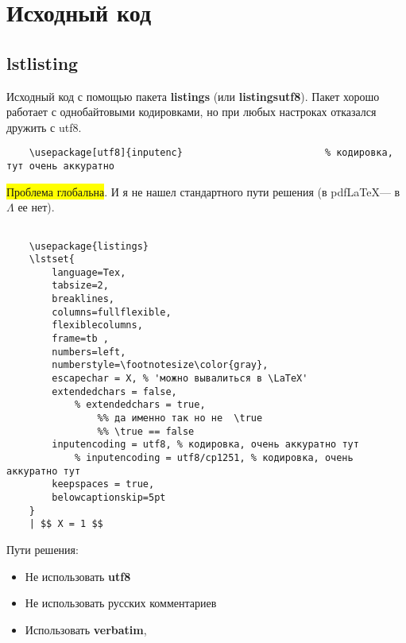 \section[Исходный код]{Исходный код}

\subsection{lstlisting}

Исходный код с помощью пакета \textbf{listings} (или \textbf{listingsutf8}).
Пакет хорошо работает с однобайтовыми кодировками, но при любых настроках отказался дружить с utf8.

\begin{lstlisting}
	\usepackage[utf8]{inputenc}							% кодировка, тут очень аккуратно
\end{lstlisting}

\colorbox{yellow}{Проблема глобальна}.
И я не нашел стандартного пути решения (в pdf\LaTeX --- в $\Lambda$ ее нет).

\begin{lstlisting}[firstnumber=100]

	\usepackage{listings}
	\lstset{
		language=Tex,
		tabsize=2,
		breaklines,
		columns=fullflexible,
		flexiblecolumns,
		frame=tb ,
		numbers=left,
		numberstyle=\footnotesize\color{gray},
		escapechar = X, % 'можно вывалиться в \LaTeX'
		extendedchars = false,
			% extendedchars = true,
				%% да именно так но не  \true
				%% \true == false
		inputencoding = utf8, % кодировка, очень аккуратно тут
			% inputencoding = utf8/cp1251, % кодировка, очень аккуратно тут
		keepspaces = true,
		belowcaptionskip=5pt
	}
    | $$ X = 1 $$
\end{lstlisting}

Пути решения:
\begin{itemize}
	\item Не использовать \textbf{utf8}
	\item Не использовать русских комментариев
	\item Использовать \textbf{verbatim}, 
\end{itemize}

\pagebreak

